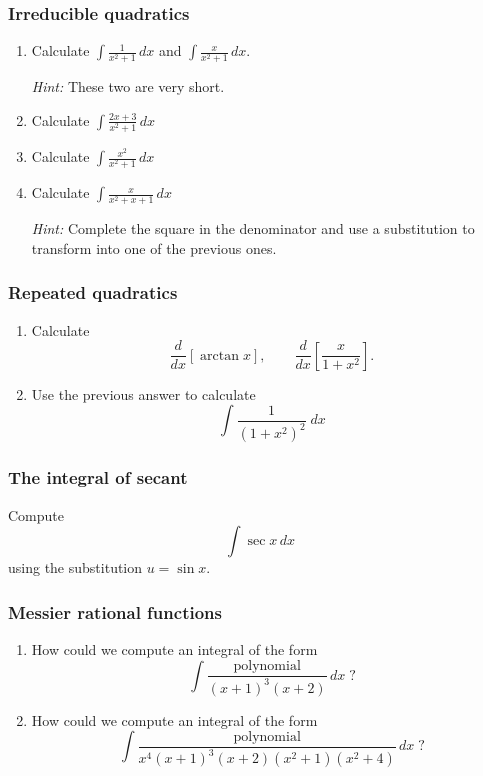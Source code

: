 \documentclass[14pt]{beamer}
\begin{document}
\begin{frame}[t]
	\fontsize{13}{13}\selectfont
	\frametitle{Irreducible quadratics}

	\begin{enumerate}
		\item Calculate $\displaystyle \int \frac{1}{x^{2}+ 1}\, dx$ and $\displaystyle
			\int \frac{x}{x^{2}+1}\, dx$.
			\vspace{.2cm}

			\emph{Hint:} These two are very short.
			\vspace{.2cm}

		\item Calculate $\displaystyle \int \frac{2x+ 3}{x^{2}+ 1}\, dx$
			\vspace{.2cm}

		\item Calculate $\displaystyle \int \frac{x^{2}}{x^{2}+ 1}\, dx$
			\vspace{.2cm}

		\item Calculate $\displaystyle \int \frac{x}{x^{2}+ x + 1 }\, dx$
			\vspace{.2cm}

			\emph{Hint:} Complete the square in the denominator and use a substitution
			to transform into one of the previous ones.
	\end{enumerate}
\end{frame}

\begin{frame}[t]
	\frametitle{Repeated quadratics}

	\begin{enumerate}
		\item Calculate
			\[
				\frac{d}{dx}\left[ \arctan x \right], \quad \quad \frac{d}{dx}\left[ \frac{x}{1+x^{2}}
				\right].
			\]

		\item Use the previous answer to calculate
			\[
				\int \frac{1}{\left(1+x^{2}\right)^{2}}\; dx
			\]
	\end{enumerate}
\end{frame}

\begin{frame}[t]
	\frametitle{The integral of secant}

	Compute
	\[
		\int \sec x \, dx
	\]
	using the substitution $\displaystyle u = \sin x$.
\end{frame}

\begin{frame}[t]
	\frametitle{Messier rational functions}

	\begin{enumerate}
		\item How could we compute an integral of the form
			\[
				\int \frac{\text{polynomial}}{(x+1)^{3}(x+2)}\, dx \; ?
			\]

		\item How could we compute an integral of the form
			\[
				\int \frac{\text{polynomial}}{x^{4}(x+1)^{3}(x+2)(x^{2}+1)(x^{2}+4)}\,dx
				\; ?
			\]
	\end{enumerate}
\end{frame}
\end{document}
